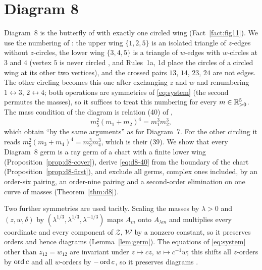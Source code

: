 \section{Diagram 8}\label{sec:d8}

Diagram~8 is the butterfly of \cite[\S7.4]{AK} with exactly one circled wing
(Fact~\ref{fact:fig11}).  We use the numbering of \cite[\S8.8]{AK}: the upper wing $\{1,2,5\}$
is an isolated triangle of $z$-edges without $z$-circles, the lower wing $\{3,4,5\}$ is a
triangle of $w$-edges with $w$-circles at $3$ and $4$ (vertex $5$ is never circled
\cite[\S7.4]{AK}, and Rules~1a, 1d place the circles of a circled wing at its other two
vertices), and the crossed pairs $13$, $14$, $23$, $24$ are not edges.
The other circling becomes this one after exchanging $z$ and $w$ and renumbering
$1\leftrightarrow3$, $2\leftrightarrow4$; both operations are symmetries of \eqref{eq:system}
(the second permutes the masses), so it suffices to treat this numbering for every
$m\in\mathbb{R}_{>0}^5$.
The mass condition of the diagram is relation (40) of \cite[\S8.8]{AK},
\begin{equation}\label{eq:d8-40}
  m_5^2(m_1+m_2)^4=m_1^3m_2^3,
\end{equation}
which \cite[p.~578]{AK} obtain ``by the same arguments'' as for Diagram~7.  For the other
circling it reads $m_5^2(m_3+m_4)^4=m_3^3m_4^3$, which is their (39).
We show that every Diagram~8 germ is a ray germ of a chart with a finite lower wing
(Proposition~\ref{prop:d8-cover}), derive \eqref{eq:d8-40} from the boundary of the chart
(Proposition~\ref{prop:d8-first}), and exclude all germs, complex ones included, by an
order-six pairing, an order-nine pairing and a second-order elimination on one curve of
masses (Theorem~\ref{thm:d8}).

Two further symmetries are used tacitly.  Scaling the masses by $\lambda>0$ and $(z,w,\delta)$
by $(\lambda^{1/3},\lambda^{1/3},\lambda^{-1/3})$ maps $A_m$ onto $A_{\lambda m}$ and multiplies
every coordinate and every component of $\mathcal Z$, $\mathcal W$ by a nonzero constant, so it
preserves orders and hence diagrams (Lemma~\ref{lem:germ}).
The equations of \eqref{eq:system} other than $z_{12}=w_{12}$ are invariant under $z\mapsto cz$,
$w\mapsto c^{-1}w$; this shifts all $z$-orders by $\operatorname{ord} c$ and all $w$-orders by $-\operatorname{ord} c$, so it
preserves diagrams \cite[p.~547]{AK}.

